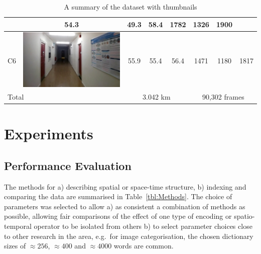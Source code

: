 \begin{table}[ht]
\begin{center}
\begin{tabular}{l c c c c c c c}
\begin{minipage}{.2\textwidth}
			   \end{minipage}
			        & 54.3  & 49.3 & 58.4 & 1782          & 1326 & 1900 \\ \hline
    C6       & \begin{minipage}{.2\textwidth}
      			\includegraphics[width=\linewidth]{./gfx/Chapter04/table/6.jpg}
			   \end{minipage}
			        & 55.9  & 55.4 & 56.4 & 1471          & 1180 & 1817 \\ \hline \hline
	\multicolumn{2}{l}{Total}      & \multicolumn{3}{c}{3.042 km} & \multicolumn{3}{c}{90,302 frames} \\ \hline
    \end{tabular}
\end{center}
\caption{A summary of the dataset with thumbnails}
\label{tbl:Datasets}
\end{table}


\section{Experiments}
\label{sec:exp_methods}

\subsection{Performance Evaluation}

The methods for a) describing spatial or space-time structure, b) indexing and comparing the data are summarised in Table~\ref{tbl:Methods}. The choice of parameters was selected to allow a) as consistent a combination of methods as possible, allowing fair comparisons of the effect of one type of encoding or spatio-temporal operator to be isolated from others b) to select parameter choices close to other research in the area, e.g.\ for image categorisation, the chosen dictionary sizes of $\approx 256$, $\approx 400$ and $\approx 4000$ words are common. 

